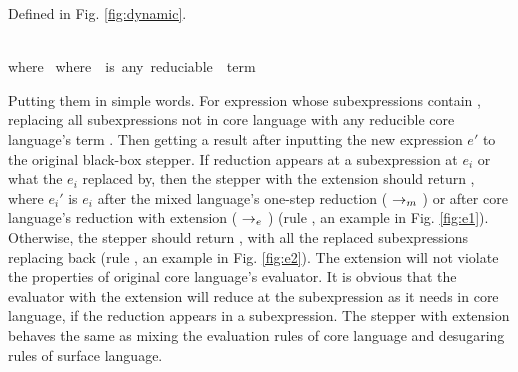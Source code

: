 \begin{Def} Defined in Fig.  \ref{fig:dynamic}.



\end{Def}

\begin{figure*}[t]
{}
{\\where~}
{}
\scriptsize{where~~is~any~reduciable~~term}
\caption{Dynamic reduction}
\label{fig:dynamic}
\end{figure*}


Putting them in simple words. For expression  whose subexpressions contain , replacing all  subexpressions not in core language with any reducible core language's term . Then getting a result after inputting the new expression $e'$ to the original black-box stepper. If reduction appears at a subexpression at $e_i$ or what the $e_i$ replaced by, then the stepper with the extension should return , where $e_i'$ is $e_i$ after the mixed language's one-step reduction ($~\rightarrow_m~$) or after core language's reduction with extension ($~\rightarrow_e~$) (rule , an example in Fig.  \ref{fig:e1}). Otherwise, the stepper should return , with all the replaced subexpressions replacing back (rule , an example in Fig.  \ref{fig:e2}). The extension will not violate the properties of original core language's evaluator. It is obvious that the evaluator with the extension will reduce at the subexpression as it needs in core language, if the reduction appears in a subexpression. The stepper with extension behaves the same as mixing the evaluation rules of core language and desugaring rules of surface language.

